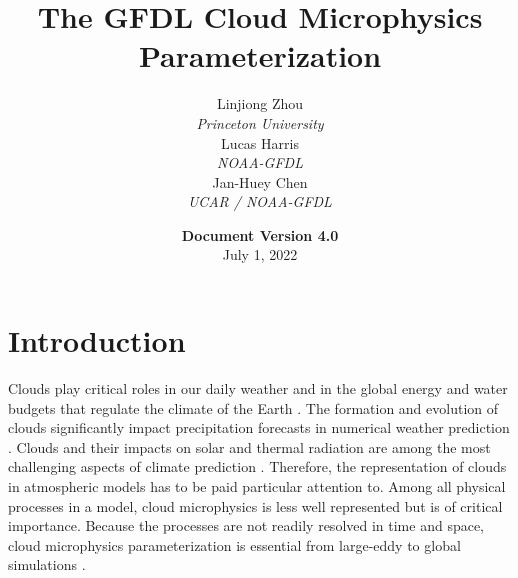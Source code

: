 \documentclass[letterpaper,titlepage,10pt]{article}
\numberwithin{equation}{section}
\begin{document}

\begin{titlepage}
\title{\textbf{\Huge{The GFDL Cloud Microphysics Parameterization}}}
\author{\Large{Linjiong Zhou}\\[0.2cm]\large{\emph{Princeton University}}\\[0.2cm]\Large{Lucas Harris}\\[0.2cm]\large{\emph{NOAA-GFDL}}\\[0.2cm]\Large{Jan-Huey Chen}\\[0.2cm]\large{\emph{UCAR / NOAA-GFDL}}\\[8cm]}
\date{\textbf{Document Version 4.0}\\[0.2cm]July 1, 2022}
\end{titlepage}
\maketitle


\setlength{\parskip}{0em}
\tableofcontents

\newpage
{}

\setlength{\parskip}{1.2em}


\section{Introduction}

Clouds play critical roles in our daily weather and in the global energy and water budgets that regulate the climate of the Earth \citep{lamb2011phys, houze2014clou}. The formation and evolution of clouds significantly impact precipitation forecasts in numerical weather prediction \citep{seifert2005atwo, morrison2008anov, baldauf2011oper, bauer2015theq}. Clouds and their impacts on solar and thermal radiation are among the most challenging aspects of climate prediction \citep{trenberth2009eart, stephens2012anup, wild2019thec}. Therefore, the representation of clouds in atmospheric models has to be paid particular attention to. Among all physical processes in a model, cloud microphysics is less well represented but is of critical importance. Because the processes are not readily resolved in time and space, cloud microphysics parameterization is essential from large-eddy to global simulations \citep{morrison2008anov, kogan2013acum, nogherotto2016nume}.
\end{document}

